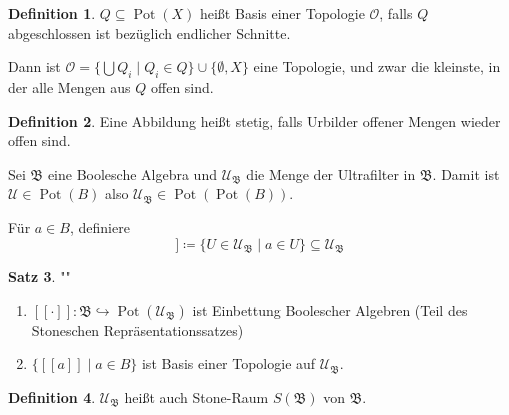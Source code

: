 \documentclass[12pt,parskip=full]{scrartcl}
\theoremstyle{definition}
\newtheorem{theorem}{Satz}[section]
\newtheorem{definition}[theorem]{Definition}
\begin{document}
	\begin{definition}
		$Q \subseteq \operatorname{Pot}(X)$ heißt Basis einer Topologie $\mathcal{O}$, falls $Q$ abgeschlossen ist bezüglich endlicher Schnitte.
		
		Dann ist $\mathcal{O} = \{ \bigcup Q_i \mid Q_i \in Q \} \cup \{ \emptyset, X \}$ eine Topologie, und zwar die kleinste, in der alle Mengen aus $Q$ offen sind.
	\end{definition}

	\begin{definition}
		Eine Abbildung heißt stetig, falls Urbilder offener Mengen wieder offen sind.
	\end{definition}

	Sei $\mathfrak{B}$ eine Boolesche Algebra und $\mathcal{U}_\mathfrak{B}$ die Menge der Ultrafilter in $\mathfrak{B}$. Damit ist $\mathcal{U} \in \operatorname{Pot}(B)$ also $\mathcal{U}_\mathfrak{B} \in \operatorname{Pot}(\operatorname{Pot}(B))$.
	
	Für $a \in B$, definiere
	\begin{equation*}
		[[a]] \coloneqq \{ U \in \mathcal{U}_\mathfrak{B} \mid a \in U \} \subseteq \mathcal{U}_\mathfrak{B}
	\end{equation*}
	
	\begin{theorem}""
		\begin{enumerate}
			\item $[[\cdot]]: \mathfrak{B} \hookrightarrow \operatorname{Pot}(\mathcal{U}_\mathfrak{B})$ ist Einbettung Boolescher Algebren (Teil des Stoneschen Repräsentationssatzes)
			\item $\{ [[a]] \mid a \in B \}$ ist Basis einer Topologie auf $\mathcal{U}_\mathfrak{B}$.
		\end{enumerate}
	\end{theorem}

	\begin{definition}
		$\mathcal{U}_\mathfrak{B}$ heißt auch Stone-Raum $S(\mathfrak{B})$ von $\mathfrak{B}$.
	\end{definition}
\end{document}
